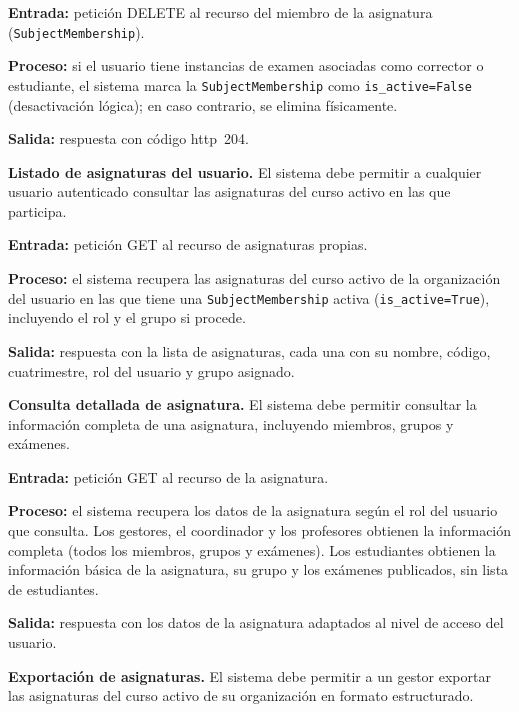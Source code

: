 \begin{functional}
    \textbf{Entrada:} petición DELETE al recurso del miembro de la asignatura
    (\texttt{SubjectMembership}).

    \textbf{Proceso:} si el usuario tiene instancias de examen asociadas como corrector o
    estudiante, el sistema marca la \texttt{SubjectMembership} como
    \texttt{is\_active=False} (desactivación lógica); en caso contrario, se elimina
    físicamente.

    \textbf{Salida:} respuesta con código \acs{http}~204.

    \item \textbf{Listado de asignaturas del usuario.} \label{rf:subjects:own_list}
    El sistema debe permitir a cualquier usuario autenticado consultar las asignaturas del
    curso activo en las que participa.

    \textbf{Entrada:} petición GET al recurso de asignaturas propias.

    \textbf{Proceso:} el sistema recupera las asignaturas del curso activo de la
    organización del usuario en las que tiene una \texttt{SubjectMembership} activa
    (\texttt{is\_active=True}), incluyendo el rol y el grupo si procede.

    \textbf{Salida:} respuesta con la lista de asignaturas, cada una con su nombre, código,
    cuatrimestre, rol del usuario y grupo asignado.

    \item \textbf{Consulta detallada de asignatura.} \label{rf:subjects:detail}
    El sistema debe permitir consultar la información completa de una asignatura, incluyendo
    miembros, grupos y exámenes.

    \textbf{Entrada:} petición GET al recurso de la asignatura.

    \textbf{Proceso:} el sistema recupera los datos de la asignatura según el rol del
    usuario que consulta. Los gestores, el coordinador y los profesores obtienen la
    información completa (todos los miembros, grupos y exámenes). Los estudiantes obtienen
    la información básica de la asignatura, su grupo y los exámenes publicados, sin lista
    de estudiantes.

    \textbf{Salida:} respuesta con los datos de la asignatura adaptados al nivel de acceso
    del usuario.

    \item \textbf{Exportación de asignaturas.} \label{rf:subjects:export}
    El sistema debe permitir a un gestor exportar las asignaturas del curso activo de su
    organización en formato estructurado.


\end{functional}
